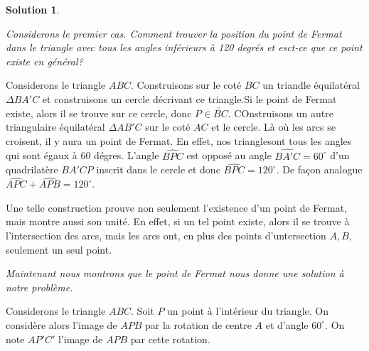 \documentclass[10pt,a4paper]{article}%
\theoremstyle{theorem}
\theoremstyle{definition}
\newtheorem*{solution*}{Solution}
\begin{document}
\begin{solution*}
\begin{center}
\begin{tikzpicture}
				
				\end{tikzpicture}
			\end{center}
			
			\textit{Considerons le premier cas. Comment trouver la position du point de Fermat dans le triangle avec tous les angles inférieurs à 120 degrés et esct-ce que ce point existe en général?}
			
			Considerons le triangle $ABC$. Construisons sur le coté $BC$ un triandle équilatéral $\Delta BA'C$ et construisons un cercle décrivant ce triangle.Si le point de Fermat existe, alors il se trouve sur ce cercle, donc $P\in \check{BC}$. COnstruisons un autre triangulaire équilatéral $\Delta AB'C$ sur le coté $AC$ et le cercle. Là où les arcs se croisent, il y aura un point de Fermat. En effet, nos trianglesont tous les angles qui sont égaux à 60  dégres. L'angle $\widehat{BPC}$ est opposé au angle $\widehat{BA'C}=60^\circ$ d'un quadrilatère $BA'CP$ inscrit dans le cercle et donc $\widehat{BPC}=120^\circ$. De façon analogue $\widehat{APC}+\widehat{APB}=120^\circ$.
			
			Une telle construction prouve non seulement l'existence d'un point de Fermat, mais montre aussi son unité. En effet, si un tel point existe, alors il se trouve à l'intersection des arcs, mais les arcs ont, en plus des points d'untersection $A,B$, seulement un seul point.
			
			
			\textit{Maintenant nous montrons que le point de Fermat nous donne une solution à notre problème.}
			
			Considerons le triangle $ABC$. Soit $P$ un point à l'intérieur du triangle. On considère alors l'image de $APB$ par la rotation de centre $A$ et d'angle $60^\circ$. On note $AP'C'$ l'image de $APB$ par cette rotation.	
		
		 

\end{solution*}
\end{document}

